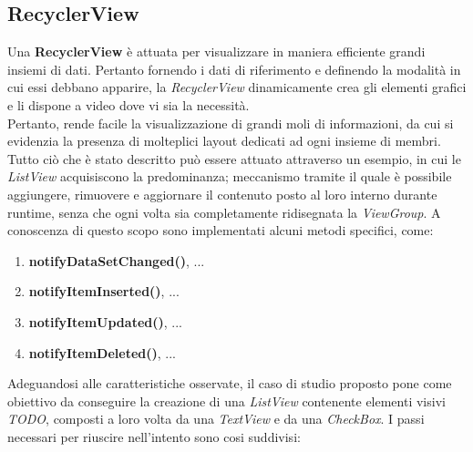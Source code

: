 \documentclass{article}
\begin{document}
\subsection*{RecyclerView}
Una \textbf{RecyclerView} è attuata per visualizzare in maniera efficiente grandi insiemi di dati. Pertanto fornendo i dati di riferimento e definendo la modalità in cui essi debbano apparire, la \textit{RecyclerView} dinamicamente crea gli elementi grafici e li dispone a video dove vi sia la necessità. \vspace*{14pt}\\
Pertanto, rende facile la visualizzazione di grandi moli di informazioni, da cui si evidenzia la presenza di molteplici layout dedicati ad ogni insieme di membri.\vspace*{14pt}\\
Tutto ciò che è stato descritto può essere attuato attraverso un esempio, in cui le \textit{ListView} acquisiscono la predominanza; meccanismo tramite il quale è possibile aggiungere, rimuovere e aggiornare il contenuto posto al loro interno durante runtime, senza che ogni volta sia completamente ridisegnata la \textit{ViewGroup}. A conoscenza di questo scopo sono implementati alcuni metodi specifici, come:
\begin{enumerate}
  \itemsep0em
  \renewcommand{\labelenumi}{-}
  \item \textbf{notifyDataSetChanged()}, ...
  \item \textbf{notifyItemInserted()}, ...
  \item \textbf{notifyItemUpdated()}, ...
  \item \textbf{notifyItemDeleted()}, ...
\end{enumerate}
Adeguandosi alle caratteristiche osservate, il caso di studio proposto pone come obiettivo da conseguire la creazione di una \textit{ListView} contenente elementi visivi \textit{TODO}, composti a loro volta da una \textit{TextView} e da una \textit{CheckBox}. I passi necessari per riuscire nell'intento sono cosi suddivisi:
\end{document}
